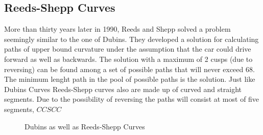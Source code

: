 \subsection{Reeds-Shepp Curves}
More than thirty years later in 1990, Reeds and Shepp solved a problem seemingly similar to the one of Dubins. They developed a solution for calculating paths of upper bound curvature under the assumption that the car could drive forward as well as backwards. The solution with a maximum of 2 cusps (due to reversing) can be found among a set of possible paths that will never exceed 68. The minimum lenght path in the pool of possible paths is the solution. Just like Dubins Curves Reeds-Shepp curves also are made up of curved and straight segments. Due to the possibility of reversing the paths will consist at most of five segments, $CCSCC$ \cite{Reeds.1990}
\begin{figure}[h]
    \caption{Dubins as well as Reeds-Shepp Curves}
    \label{fig:shortestPaths}
\end{figure}













































